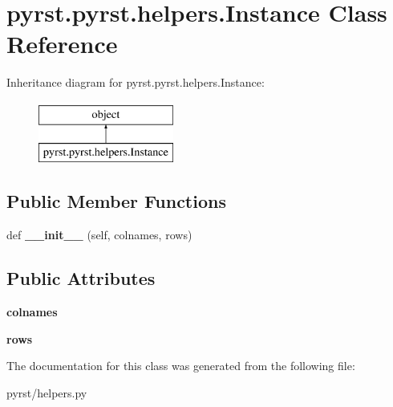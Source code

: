 \hypertarget{classpyrst_1_1pyrst_1_1helpers_1_1_instance}{}\section{pyrst.\+pyrst.\+helpers.\+Instance Class Reference}
\label{classpyrst_1_1pyrst_1_1helpers_1_1_instance}
Inheritance diagram for pyrst.\+pyrst.\+helpers.\+Instance\+:\begin{figure}[H]
\begin{center}
\leavevmode
\includegraphics[height=2.000000cm]{classpyrst_1_1pyrst_1_1helpers_1_1_instance}
\end{center}
\end{figure}
\subsection*{Public Member Functions}
\begin{DoxyCompactItemize}
\item 
\hypertarget{classpyrst_1_1pyrst_1_1helpers_1_1_instance_abbfff8f9320f6f52629a32cc796538f7}{}def {\bfseries \+\_\+\+\_\+init\+\_\+\+\_\+} (self, colnames, rows)\label{classpyrst_1_1pyrst_1_1helpers_1_1_instance_abbfff8f9320f6f52629a32cc796538f7}

\end{DoxyCompactItemize}
\subsection*{Public Attributes}
\begin{DoxyCompactItemize}
\item 
\hypertarget{classpyrst_1_1pyrst_1_1helpers_1_1_instance_af4a45c81b48048340c6ae19f8899ca9e}{}{\bfseries colnames}\label{classpyrst_1_1pyrst_1_1helpers_1_1_instance_af4a45c81b48048340c6ae19f8899ca9e}

\item 
\hypertarget{classpyrst_1_1pyrst_1_1helpers_1_1_instance_aba9410bbd256503becd58fc393cc08f2}{}{\bfseries rows}\label{classpyrst_1_1pyrst_1_1helpers_1_1_instance_aba9410bbd256503becd58fc393cc08f2}

\end{DoxyCompactItemize}


The documentation for this class was generated from the following file\+:\begin{DoxyCompactItemize}
\item 
pyrst/helpers.\+py\end{DoxyCompactItemize}
